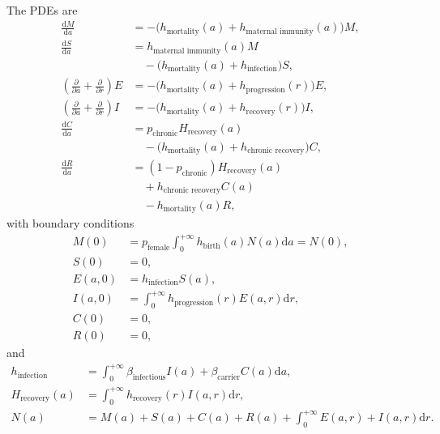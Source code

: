 \documentclass[12pt]{article}
\newcommand{\md}{\mathrm{d}}
\begin{document}
The PDEs are
\begin{equation}
  \begin{split}
    \frac{\md M}{\md a}
    &= - \big(h_{\text{mortality}}(a)
    + h_{\text{maternal immunity}}(a)\big) M,
    \\
    \frac{\md S}{\md a}
    &= h_{\text{maternal immunity}}(a) M
    \\ & \quad {}
    - \big(h_{\text{mortality}}(a)
      + h_{\text{infection}}
    \big) S,
    \\
    \left(
      \frac{\partial}{\partial a}
      + \frac{\partial}{\partial r}
    \right) E
    &=- \big(h_{\text{mortality}}(a)
    + h_{\text{progression}}(r)\big) E,
    \\
    \left(
      \frac{\partial}{\partial a}
      + \frac{\partial}{\partial r}
    \right) I
    &= - \big(h_{\text{mortality}}(a)
    + h_{\text{recovery}}(r)\big) I,
    \\
    \frac{\md C}{\md a}
    &= p_{\text{chronic}} H_{\text{recovery}}(a)
    \\ & \quad {}
    - \big(h_{\text{mortality}}(a)
    + h_{\text{chronic recovery}}\big) C,
    \\
    \frac{\md R}{\md a}
    &= (1 - p_{\text{chronic}}) H_{\text{recovery}}(a)
    \\ & \quad {}
    + h_{\text{chronic recovery}} C(a)
    \\ & \quad {}
    - h_{\text{mortality}}(a) R,
  \end{split}
\end{equation}
with boundary conditions
\begin{equation}
  \begin{split}
    M(0)
    &= p_{\text{female}}
    \int_0^{+\infty} h_{\text{birth}}(a) N(a) \md a
    = N(0),
    \\
    S(0) &= 0,
    \\
    E(a, 0)
    &= h_{\text{infection}} S(a),
    \\
    I(a, 0)
    &= \int_0^{+\infty}h_{\text{progression}}(r) E(a, r) \md r,
    \\
    C(0) &= 0,
    \\
    R(0) &= 0,
  \end{split}
\end{equation}
and
\begin{equation}
  \begin{split}
    h_{\text{infection}}
    &= \int_0^{+\infty} \beta_{\text{infectious}} I(a)
    + \beta_{\text{carrier}} C(a) \md a,
    \\
    H_{\text{recovery}}(a)
    &= \int_0^{+\infty}h_{\text{recovery}}(r) I(a, r) \md r,
    \\
    N(a) &= M(a) + S(a) + C(a) + R(a)
    + \int_0^{+\infty} E(a, r) + I(a, r) \md r.
  \end{split}
\end{equation}
\end{document}
